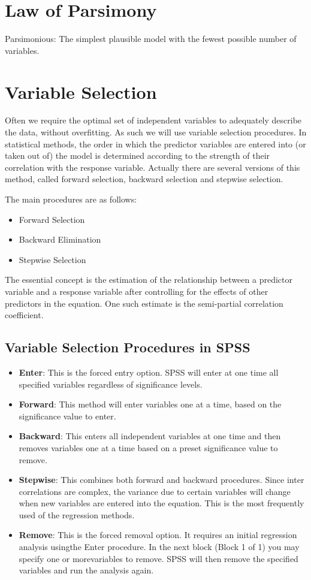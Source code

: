 \documentclass[a4paper,12pt]{article}
\begin{document}
	
	\tableofcontents
\section{Law of Parsimony}
Parsimonious: The simplest plausible model with the fewest possible number of variables.





\section{Variable Selection}
Often we require the optimal set of independent variables to adequately describe the data, without overfitting. As such we will use variable selection procedures. In statistical methods, the order in which the predictor variables are entered into (or taken out of) the model is determined according to the strength of their correlation with the response variable. Actually there are several versions of this method, called forward selection, backward selection and stepwise selection.

The main procedures are as follows:
\begin{itemize}
	\item Forward Selection
	\item Backward Elimination
	\item Stepwise Selection
\end{itemize}

The essential concept is the estimation of the relationship between a predictor
variable and a response variable after controlling for the effects of other
predictors in the equation. One such estimate is the semi-partial correlation coefficient.

\subsection{Variable Selection Procedures in SPSS}

\begin{itemize}
	\item \textbf{Enter}: This is the forced entry option. SPSS will enter at one time all specified variables regardless of significance levels.
	\item \textbf{Forward}: This method will enter variables one at a time, based on the significance value to enter.
	\item \textbf{Backward}: This enters all independent variables at one time and then removes variables one at a time based on a preset significance value to remove.
	\item \textbf{Stepwise}: This combines both forward and backward procedures. Since inter correlations are complex, the variance due to certain variables will change when new variables are entered into the equation. This is the most frequently used of the regression methods.
	\item \textbf{Remove}: This is the forced removal option. It requires an initial regression analysis usingthe Enter procedure. In the next block (Block 1 of 1) you may specify one or morevariables to remove. SPSS will then remove the specified variables and run the analysis again.
\end{itemize}
\end{document}

